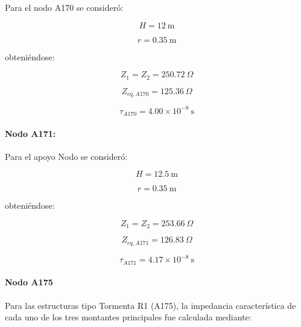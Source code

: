 \documentclass[12pt,letterpaper]{article}
\begin{document}
Para el nodo A170 se consideró:

\begin{equation*}
H=12\ \mathrm{m}
\end{equation*}

\begin{equation*}
r=0.35\ \mathrm{m}
\end{equation*}

obteniéndose:

\begin{equation*}
Z_1=Z_2=250.72\ \Omega
\end{equation*}

\begin{equation*}
Z_{eq,A170}=125.36\ \Omega
\end{equation*}

\begin{equation*}
\tau_{A170}
=4.00\times10^{-8}\ \mathrm{s}
\end{equation*}

\paragraph{Nodo A171:}

Para el apoyo Nodo se consideró:

\begin{equation*}
H=12.5\ \mathrm{m}
\end{equation*}

\begin{equation*}
r=0.35\ \mathrm{m}
\end{equation*}

obteniéndose:

\begin{equation*}
Z_1=Z_2=253.66\ \Omega
\end{equation*}

\begin{equation*}
Z_{eq,A171}=126.83\ \Omega
\end{equation*}

\begin{equation*}
\tau_{A171}=4.17\times10^{-8}\ \mathrm{s}
\end{equation*}

\paragraph{Nodo A175}

Para las estructuras tipo Tormenta R1 (A175), la impedancia característica de cada uno de los tres montantes principales fue calculada mediante:
\end{document}

